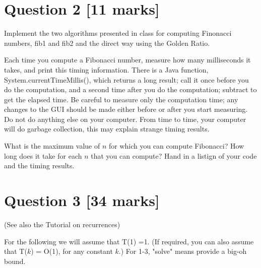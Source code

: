 \documentclass[11pt]{article}
\begin{document}
\section*{Question 2 [11 marks]}
Implement the two algorithms presented in class for computing Finonacci numbers, fib1 and fib2 and the direct way using the Golden Ratio.

Each time you compute a Fibonacci number, measure how many milliseconds it takes, and print this timing information. There is a Java function, System.currentTimeMillis(), which returns a long result; call it once before you do the computation, and a second time after you do the computation; subtract to get the elapsed time. Be careful to measure only the computation time; any changes to the GUI should be made either before or after you start measuring. Do not do anything else on your computer. 
From time to time, your computer will do garbage collection, this may explain strange timing results.

What is the maximum value of $n$ for which you can compute Fibonacci? How long does it take for each $n$ that you can compute?
Hand in a listign of your code and the timing results.

%
\section*{Question 3 [34 marks]}
(See also the Tutorial on recurrences)

For the following we will assume that T(1) =1. (If required, you can also assume that T($k$) = O(1), for any constant $k$.) 
For 1-3, "solve" means provide a big-oh bound. 
\end{document}
